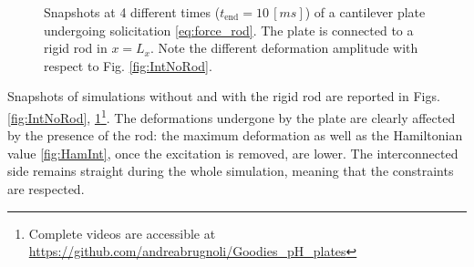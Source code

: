 \documentclass[letterpaper, 10 pt, conference]{ieeeconf}
\begin{document}
\begin{figure}[h!]
	\centering
	\hfil
	\caption{Snapshots at 4 different times ($t_{\text{end}} = 10 \,[ms]$) of a cantilever plate undergoing solicitation \eqref{eq:force_rod}. The plate is connected to a rigid rod in $x = L_x$. Note the different deformation amplitude with respect to Fig. \ref{fig:IntNoRod}.}
	\label{fig:IntRod}
\end{figure}
Snapshots of simulations without and with the rigid rod are reported in Figs. \ref{fig:IntNoRod}, \ref{fig:IntRod}\footnote{\label{note:1}Complete videos are accessible at \url{https://github.com/andreabrugnoli/Goodies_pH_plates}}. The deformations undergone by the plate are clearly affected by the presence of the rod: the maximum deformation as well as the Hamiltonian value \ref{fig:HamInt}, once the excitation is removed, are lower. The interconnected side remains straight during the whole simulation, meaning that the constraints are respected.
\end{document}
